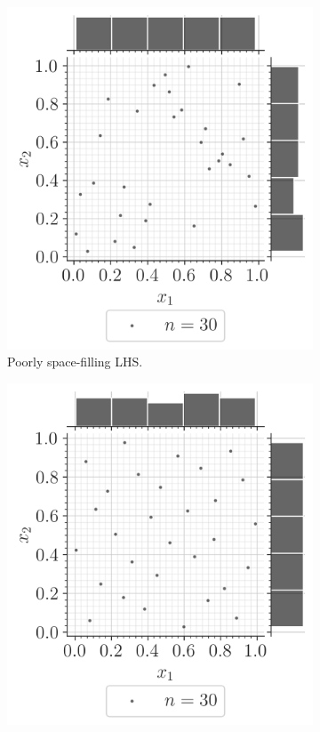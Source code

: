 \begin{figure}[ht]
    \centering
    \begin{subfigure}[b]{0.32\textwidth}
        \centering
        \includegraphics[width=\textwidth]{../numerical_experiments/chapter1/figures/poor_LHS.png}
        \caption{Poorly space-filling LHS.}
        \label{fig:poor_LHS}
    \end{subfigure}
    \hfill
    \begin{subfigure}[b]{0.32\textwidth}
        \centering
        \includegraphics[width=\textwidth]{../numerical_experiments/chapter1/figures/optimized_C2_LHS.png}

\end{subfigure}
\end{figure}
